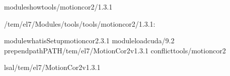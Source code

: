 \documentclass[a4paper,11pt,english]{sphinxmanual}
\begin{document}
\begin{sphinxVerbatim}[commandchars=\\\{\}]

\PYGZdl{}\PYGZgt{}moduleshowtools/motioncor2/1.3.1

\PYGZhy{}\PYGZhy{}\PYGZhy{}\PYGZhy{}\PYGZhy{}\PYGZhy{}\PYGZhy{}\PYGZhy{}\PYGZhy{}\PYGZhy{}\PYGZhy{}\PYGZhy{}\PYGZhy{}\PYGZhy{}\PYGZhy{}\PYGZhy{}\PYGZhy{}\PYGZhy{}\PYGZhy{}\PYGZhy{}\PYGZhy{}\PYGZhy{}\PYGZhy{}\PYGZhy{}\PYGZhy{}\PYGZhy{}\PYGZhy{}\PYGZhy{}\PYGZhy{}\PYGZhy{}\PYGZhy{}\PYGZhy{}\PYGZhy{}\PYGZhy{}\PYGZhy{}\PYGZhy{}\PYGZhy{}\PYGZhy{}\PYGZhy{}\PYGZhy{}\PYGZhy{}\PYGZhy{}\PYGZhy{}\PYGZhy{}\PYGZhy{}\PYGZhy{}\PYGZhy{}\PYGZhy{}\PYGZhy{}\PYGZhy{}\PYGZhy{}\PYGZhy{}\PYGZhy{}\PYGZhy{}\PYGZhy{}\PYGZhy{}\PYGZhy{}\PYGZhy{}\PYGZhy{}\PYGZhy{}\PYGZhy{}\PYGZhy{}\PYGZhy{}\PYGZhy{}\PYGZhy{}\PYGZhy{}\PYGZhy{}
/tem/el7/Modules/tools/tools/motioncor2/1.3.1:

module\PYGZhy{}whatisSetupmotioncor2.3.1
moduleloadcuda/9.2
prepend\PYGZhy{}pathPATH/tem/el7/MotionCor2\PYGZus{}v1.3.1
conflicttools/motioncor2
\PYGZhy{}\PYGZhy{}\PYGZhy{}\PYGZhy{}\PYGZhy{}\PYGZhy{}\PYGZhy{}\PYGZhy{}\PYGZhy{}\PYGZhy{}\PYGZhy{}\PYGZhy{}\PYGZhy{}\PYGZhy{}\PYGZhy{}\PYGZhy{}\PYGZhy{}\PYGZhy{}\PYGZhy{}\PYGZhy{}\PYGZhy{}\PYGZhy{}\PYGZhy{}\PYGZhy{}\PYGZhy{}\PYGZhy{}\PYGZhy{}\PYGZhy{}\PYGZhy{}\PYGZhy{}\PYGZhy{}\PYGZhy{}\PYGZhy{}\PYGZhy{}\PYGZhy{}\PYGZhy{}\PYGZhy{}\PYGZhy{}\PYGZhy{}\PYGZhy{}\PYGZhy{}\PYGZhy{}\PYGZhy{}\PYGZhy{}\PYGZhy{}\PYGZhy{}\PYGZhy{}\PYGZhy{}\PYGZhy{}\PYGZhy{}\PYGZhy{}\PYGZhy{}\PYGZhy{}\PYGZhy{}\PYGZhy{}\PYGZhy{}\PYGZhy{}\PYGZhy{}\PYGZhy{}\PYGZhy{}\PYGZhy{}\PYGZhy{}\PYGZhy{}\PYGZhy{}\PYGZhy{}\PYGZhy{}\PYGZhy{}


\PYGZdl{}\PYGZgt{}ls\PYGZhy{}al/tem/el7/MotionCor2\PYGZus{}v1.3.1


\end{sphinxVerbatim}
\end{document}

